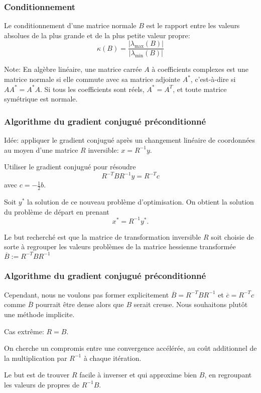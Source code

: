 \documentclass[usepdftitle=false]{beamer}
\begin{document}
\begin{frame}
\frametitle{Conditionnement}

Le conditionnement d'une matrice normale $B$ est le rapport entre les valeurs absolues de la plus grande et de la plus petite valeur propre:
$$
\kappa(B) = \frac{| \lambda_{\max}(B) |}{| \lambda_{\min}(B) |}
$$

\mbox{}

Note: En algèbre linéaire, une matrice carrée $A$ à coefficients complexes est une matrice normale si elle commute avec sa matrice adjointe $A^*$, c'est-à-dire si $AA^* = A^*A$. Si tous les coefficients sont réels, $A^* = A^T$, et toute matrice symétrique est normale.

\end{frame}

\begin{frame}
\frametitle{Algorithme du gradient conjugué préconditionné}

Idée: appliquer le gradient conjugué après un changement linéaire de coordonnées au moyen d'une matrice $R$ inversible: $x = R^{-1}y$.

\mbox{}

Utiliser le gradient conjugué pour résoudre
$$
R^{-T}BR^{-1}y = R^{-T}c
$$
avec $c = -\frac{1}{2}b$.

\mbox{}

Soit $y^*$ la solution de ce nouveau problème d'optimisation. On obtient la solution du problème de départ en prenant
$$
x^* = R^{-1} y^*.
$$

\mbox{}

Le but recherché est que la matrice de transformation inversible $R$ soit choisie de sorte à regrouper les valeurs problèmes de la matrice hessienne transformée
$
\overline{B} := R^{-T}BR^{-1}
$
\end{frame}

\begin{frame}
\frametitle{Algorithme du gradient conjugué préconditionné}

Cependant, nous ne voulons pas former explicitement $\overline{B} = R^{-T}BR^{-1}$ et $\overline{c} = R^{-T}c$ comme $\overline{B}$ pourrait être dense alors que $B$ serait creuse.
Nous souhaitons plutôt une méthode implicite.

\mbox{}

Cas extrême: $R = B$.

\mbox{}

On cherche un compromis entre une convergence accélérée, au coût additionnel de la multiplication par $R^{-1}$ à chaque itération.

\mbox{}

Le but est de trouver $R$ facile à inverser et qui approxime bien $B$, en regroupant les valeurs de propres de $R^{-1}B$.

\end{frame}
\end{document}
